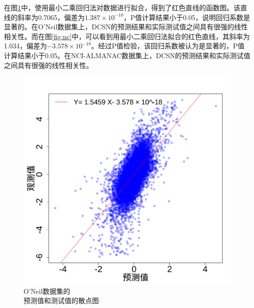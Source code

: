 在图\ref{fig:mc}中，使用最小二乘回归法对数据进行拟合，得到了红色直线的函数图。该直线的斜率为0.7065，偏差为$1.387 \times 10^{-10}$，P值计算结果小于0.05，说明回归系数是显著的。在O'Neil数据集上，DCSN的预测结果和实际测试值之间具有很强的线性相关性。而在图\ref{fig:nc}中，可以看到用最小二乘回归法拟合的红色直线，其斜率为1.034，偏差为$-3.578 \times 10^{-18}$。经过P值检验，该回归系数被认为是显著的，P值计算结果小于0.05。在NCI-ALMANAC数据集上，DCSN的预测结果和实际测试值之间具有很强的线性相关性。

\begin{figure}[H]
\centering
  \begin{minipage}{0.45\linewidth}
    \centering
    \includegraphics[width=\textwidth]{figures/p_a_scatter_m.pdf}
    \caption{O'Neil数据集的\\预测值和测试值的散点图\label{fig:mc}}
  \end{minipage}
  \begin{minipage}{0.45\linewidth}
    \centering

\end{minipage}
\end{figure}
